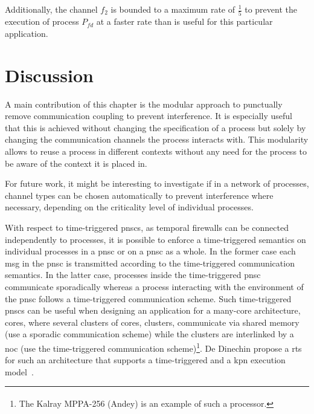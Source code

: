Additionally, the channel $f_2$ is bounded to a maximum rate of $\frac{1}{5}$ to prevent the execution of process $P_{fd}$ at a faster rate than is useful for this particular application.

\section{Discussion}
\label{sect_tcm_discussion}
A main contribution of this chapter is the modular approach to punctually remove communication coupling to prevent interference.
It is especially useful that this is achieved without changing the specification of a process but solely by changing the communication channels the process interacts with.
This modularity allows to reuse a process in different contexts without any need for the process to be aware of the context it is placed in.

For future work, it might be interesting to investigate if in a network of processes, channel types can be chosen automatically to prevent interference where necessary, depending on the criticality level of individual processes.

With respect to time-triggered \glspl{pnsc}, as temporal firewalls can be connected independently to processes, it is possible to enforce a time-triggered semantics on individual processes in a \gls{pnsc} or on a \gls{pnsc} as a whole.
In the former case each \gls*{msg} in the \gls{pnsc} is transmitted according to the time-triggered communication semantics.
In the latter case, processes inside the time-triggered \gls{pnsc} communicate sporadically whereas a process interacting with the environment of the \gls{pnsc} follows a time-triggered communication scheme.
Such time-triggered \glspl{pnsc} can be useful when designing an application for a many-core architecture,  cores, where several clusters of cores,  clusters, communicate via shared memory (use a sporadic communication scheme) while the clusters are interlinked by a \gls{noc} (use the time-triggered communication scheme)\footnote{The Kalray MPPA\textsuperscript{\textregistered}-256 (Andey) is an example of such a processor.}.
De Dinechin \etal propose a \gls{rts} for such an architecture that supports \ia a time-triggered and a \gls{kpn} execution model~\cite{deDinechin2013}.

